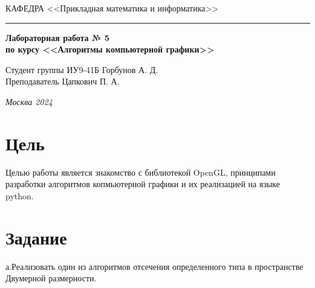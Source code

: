 \documentclass[a4paper, 14pt]{extarticle}
\begin{document}
\begin{titlepage}
\vspace{0.5ex}
\hspace{-35pt} \noindent \small КАФЕДРА\hspace{50pt} <<Прикладная математика и информатика>>

\vspace*{-16pt}
\hspace{30pt}\rule{0.866\textwidth}{0.4pt}
  
\vspace{11em}

\begin{center}
\Large {\bf Лабораторная работа № 5} \\ 
\large {\bf по курсу <<Алгоритмы компьютерной графики>>}\\
\end{center}\normalsize

\vspace{8em}


\begin{flushright}
  {Студент группы ИУ9-41Б Горбунов А. Д.\hspace*{15pt} \\
  \vspace{2ex}
  Преподаватель Цапкович П. А.\hspace*{15pt}}
\end{flushright}

\bigskip

\vfill
 

\begin{center}
\textsl{Москва 2024}
\end{center}
\end{titlepage}

\renewcommand{\ttdefault}{pcr}

\setlength{\tabcolsep}{3pt}
\newpage
\setcounter{page}{2}

\section{Цель}\label{Sect::task}
\par
Целью работы является знакомство с  библиотекой OpenGL, принципами разработки алгоритмов копмьютерной графики и их реализацией на языке python.
\section{Задание}\label{Sect::task}
\par
а.Реализовать один из алгоритмов отсечения определенного типа в пространстве Двумерной размерности.
\end{document}
